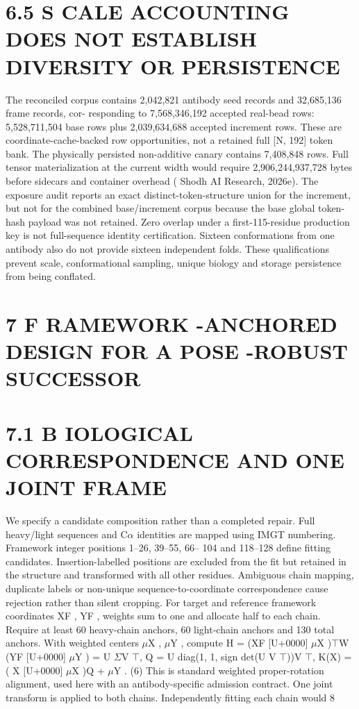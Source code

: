 \documentclass[11pt]{article}
\begin{document}
\section*{6.5 S CALE ACCOUNTING DOES NOT ESTABLISH DIVERSITY OR PERSISTENCE}

The reconciled corpus contains 2,042,821 antibody seed records and 32,685,136 frame records, cor-
responding to 7,568,346,192 accepted real-bead rows: 5,528,711,504 base rows plus 2,039,634,688
accepted increment rows. These are coordinate-cache-backed row opportunities, not a retained full
[N, 192] token bank. The physically persisted non-additive canary contains 7,408,848 rows. Full
tensor materialization at the current width would require 2,906,244,937,728 bytes before sidecars
and container overhead ( Shodh AI Research, 2026e).
The exposure audit reports an exact distinct-token-structure union for the increment, but not for
the combined base/increment corpus because the base global token-hash payload was not retained.
Zero overlap under a first-115-residue production key is not full-sequence identity certification.
Sixteen conformations from one antibody also do not provide sixteen independent folds. These
qualifications prevent scale, conformational sampling, unique biology and storage persistence from
being conflated.

\section*{7 F RAMEWORK -ANCHORED DESIGN FOR A POSE -ROBUST SUCCESSOR}


\section*{7.1 B IOLOGICAL CORRESPONDENCE AND ONE JOINT FRAME}

We specify a candidate composition rather than a completed repair. Full heavy/light sequences and
C\ensuremath{\alpha} identities are mapped using IMGT numbering. Framework integer positions 1–26, 39–55, 66–
104 and 118–128 define fitting candidates. Insertion-labelled positions are excluded from the fit
but retained in the structure and transformed with all other residues. Ambiguous chain mapping,
duplicate labels or non-unique sequence-to-coordinate correspondence cause rejection rather than
silent cropping.
For target and reference framework coordinates XF , YF , weights sum to one and allocate half to
each chain. Require at least 60 heavy-chain anchors, 60 light-chain anchors and 130 total anchors.
With weighted centers \ensuremath{\mu}X , \ensuremath{\mu}Y , compute
H = (XF [U+0000] \ensuremath{\mu}X )\ensuremath{\top}W (YF [U+0000] \ensuremath{\mu}Y ) = U \ensuremath{\Sigma}V \ensuremath{\top},
Q = U diag(1, 1, sign det(U V \ensuremath{\top}))V \ensuremath{\top},
K(X) = ( X [U+0000] \ensuremath{\mu}X )Q + \ensuremath{\mu}Y .
(6)
This is standard weighted proper-rotation alignment, used here with an antibody-specific admission
contract. One joint transform is applied to both chains. Independently fitting each chain would
8
\end{document}
